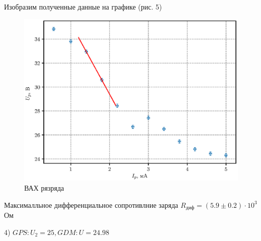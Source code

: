 \documentclass[12pt,a4paper]{article}
\begin{document}
Изобразим полученные данные на графике (рис. 5)
\begin{figure}[H]
    \centering
    \includegraphics[width=0.9\linewidth]{pics/Ip_Up.eps}
    \caption{ВАХ рязряда}
\end{figure}
Максималльное дифференциальное сопротивлние заряда $R_{диф} = (5.9 \pm 0.2) \cdot 10^3$ Ом 
 
4) $GPS :U_2=25, GDM: U=24.98$
\end{document}
